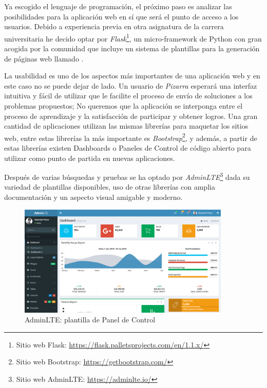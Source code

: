 \documentclass[11pt,spanish,listoffigures,listoftables]{tfgetsinf}
\begin{document}
Ya escogido el lenguaje de programación, el próximo paso es analizar las posibilidades para la aplicación web en sí que será el punto de acceso a los usuarios. Debido a experiencia previa en otra asignatura de la carrera universitaria he decido optar por \textit{Flask}\footnote{Sitio web Flask: \url{https://flask.palletsprojects.com/en/1.1.x/}}, un micro-framework de Python con gran acogida por la comunidad que incluye un sistema de plantillas para la generación de páginas web llamado . 

La usabilidad es uno de los aspectos más importantes de una aplicación web y en este caso no se puede dejar de lado. Un usuario de \textit{Pizarra} esperará una interfaz intuitiva y fácil de utilizar que le facilite el proceso de envío de soluciones a los problemas propuestos; No queremos que la aplicación se interponga entre el proceso de aprendizaje y la satisfacción de participar y obtener logros. Una gran cantidad de aplicaciones utilizan las mismas librerías para maquetar los sitios web, entre estas librerías la más importante es \textit{Bootstrap}\footnote{Sitio web Bootstrap: \url{https://getbootstrap.com/}}, y además, a partir de estas librerías existen Dashboards o Paneles de Control de código abierto para utilizar como punto de partida en nuevas aplicaciones.

Después de varias búsquedas y pruebas se ha optado por \textit{AdminLTE}\footnote{Sitio web AdminLTE: \url{https://adminlte.io/}} dada su variedad de plantillas disponibles, uso de otras librerías con amplia documentación y un aspecto visual amigable y moderno.

\begin{figure}[ht]
	\centering
	\includegraphics[width=0.9\textwidth]{img/admin-lte}
	\caption[AdminLTE: plantilla de Panel de Control ]{AdminLTE: plantilla de Panel de Control }
	\label{figura:admin-lte}
\end{figure}
\end{document}
